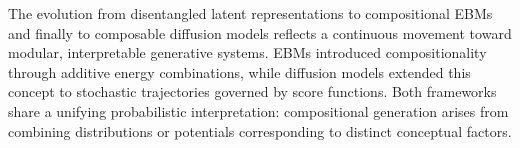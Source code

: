 
The evolution from disentangled latent representations to compositional EBMs and finally to composable diffusion models reflects a continuous movement toward modular, interpretable generative systems.  
EBMs introduced compositionality through additive energy combinations, while diffusion models extended this concept to stochastic trajectories governed by score functions.  
Both frameworks share a unifying probabilistic interpretation: compositional generation arises from combining distributions or potentials corresponding to distinct conceptual factors.  
